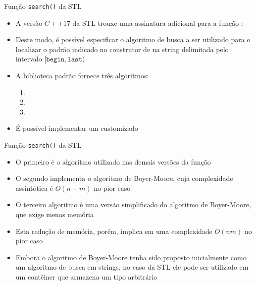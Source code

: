 \begin{frame}[fragile]{Função {\tt search()} da STL}

    \begin{itemize}
        \item A versão $C++17$ da STL trouxe uma assinatura adicional para a função 
            :

            \vspace{.1in}
            \vspace{.1in}

        \item Deste modo, é possível especificar o algoritmo de busca a ser utilizado para
            o localizar o padrão indicado no construtor de  na string
            delimitada pelo intervalo $[\mathtt{begin}, \mathtt{last})$

        \item A biblioteca padrão fornece três algoritmos:
        \begin{enumerate}
            \item {}
            \item {}
            \item {}
        \end{enumerate}

        \item É possível implementar um  customizado
    \end{itemize}

\end{frame}

\begin{frame}[fragile]{Função {\tt search()} da STL}

    \begin{itemize}

        \item O primeiro é o algoritmo utilizado nas demais versões da função 

        \item O segundo implementa o algoritmo de Boyer-Moore, cuja complexidade assintótica é
            $O(n + m)$ no pior caso

        \item O terceiro algoritmo é uma versão simplificado do algoritmo de Boyer-Moore, que 
            exige menos memória

        \item Esta redução de memória, porém, implica em uma complexidade $O(nm)$ no pior caso

        \item Embora o algoritmo de Boyer-Moore tenha sido proposto inicialmente como um algoritmo
            de busca em strings, no caso da STL ele pode ser utilizado em um contêiner que
            armazena um tipo  arbitrário
    \end{itemize}

\end{frame}

